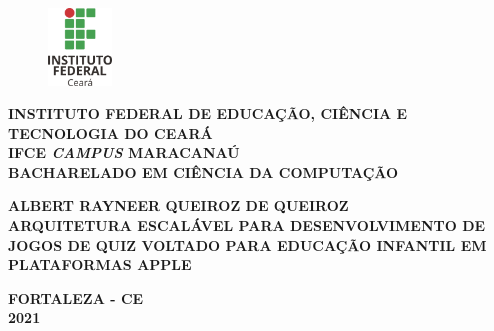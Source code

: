 \begin{titlepage}
  \begin{figure}[htb]			
	  \centering
	  \includegraphics[width=0.15\textwidth]{figuras/ifce.png}
  \end{figure}
  \begin{center}
    \textbf{INSTITUTO FEDERAL DE EDUCAÇÃO, CIÊNCIA E TECNOLOGIA DO CEARÁ}\\
    \textbf{IFCE \textit{CAMPUS} MARACANAÚ}\\
    \textbf{BACHARELADO EM CIÊNCIA DA COMPUTAÇÃO}\\

  \end{center}

 
\centering
	\begin{center}
	
		\vfill
		\textbf{ALBERT RAYNEER QUEIROZ DE QUEIROZ \\} 
\vfill
		\textbf{ARQUITETURA ESCALÁVEL PARA DESENVOLVIMENTO DE JOGOS DE QUIZ VOLTADO PARA EDUCAÇÃO INFANTIL EM PLATAFORMAS APPLE}\\
		
		
		
		
	\end{center}
	 \vfill
		
			\textbf{FORTALEZA - CE \\ 2021}
\end{titlepage}
